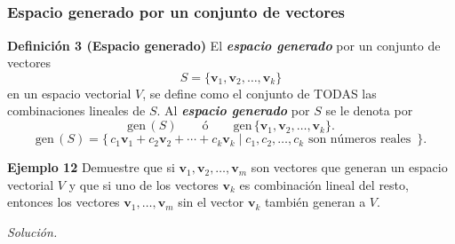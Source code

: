 
\subsection{}

{\nologo
\begin{frame}\frametitle{Espacio generado por un conjunto de vectores}
	
	\vspace{-2mm}
	\begin{block}{\textbf{Definición 3 (Espacio generado)}}
		\justifying
		El \textbf{\textit{espacio generado}} por un conjunto de vectores 
		\[
		S=\{\mathbf{v}_1,\mathbf{v}_2,\hdots,\mathbf{v}_k\}
		\]
		en un espacio vectorial $V$, se define como el conjunto de TODAS las combinaciones lineales de $S$.
		Al \textbf{\textit{espacio generado}} por $S$ se le denota por 
		\[
		\text{gen}\,(S) \qquad \text{ó} \qquad \text{gen}\, \{\mathbf{v}_1,\mathbf{v}_2,\hdots,\mathbf{v}_k\}.
		\]
		\[
		\text{gen}\,(S) = \Big\{ \, c_1\mathbf{v}_1 + c_2\mathbf{v}_2 + \cdots + c_k\mathbf{v}_k \mid c_1, c_2,\hdots,c_k  
		\text{ son números reales } \, \Big\}.
		\]
	\end{block}
	
	\begin{ej}{\textbf{Ejemplo 12}} \justifying
		Demuestre que si $\mathbf{v}_1,\mathbf{v}_2,\hdots,\mathbf{v}_m$ son vectores que generan un espacio vectorial $V$ y que si uno de los vectores $\mathbf{v}_k$ es combinación lineal del resto, entonces los vectores $\mathbf{v}_1,\hdots,\mathbf{v}_m$ sin el vector $\mathbf{v}_k$ también generan a $V$.
	\end{ej}
	\textit{Solución.}
	
\end{frame}
}


\subsection{}

